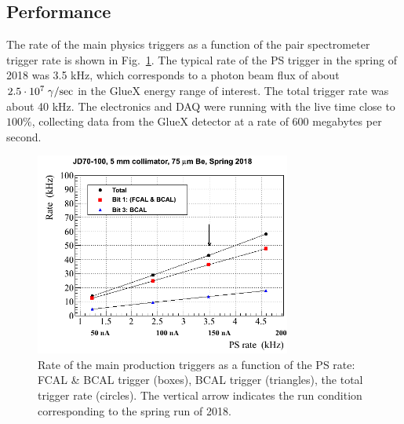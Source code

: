 \subsection{Performance \label{sec:trigperformance}}
The rate of the main physics triggers as a function of the pair 
spectrometer trigger rate is shown in Fig.~\ref{fig:trig_rate}.
The typical rate of the PS trigger in the spring of 2018 was 3.5 kHz, which corresponds to a photon beam flux of about $2.5\cdot 10^7\; \gamma/{\rm sec}$ in the GlueX energy range of interest. The total trigger rate was about 40 kHz. The electronics and DAQ were running with the live time close to 
$100 \%$, collecting data from the GlueX detector at a rate of 600 megabytes per second.


\begin{figure}[tbp]
\begin{center}
\includegraphics[width=0.75\textwidth]{figures/Rate_diamond_2018.png}  
\caption{Rate of the main production triggers as a function of the PS rate: FCAL \& BCAL trigger (boxes), BCAL trigger (triangles), the total trigger rate (circles). The vertical arrow indicates the run condition corresponding to the spring run of 2018.} \label{fig:trig_rate}
\end{center}
\end{figure}
